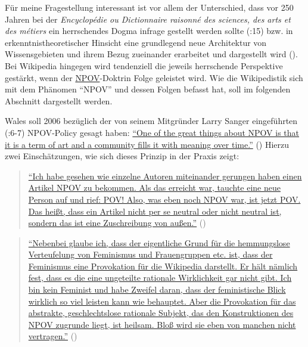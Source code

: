 \documentclass[fontsize=12pt]{scrartcl}
\begin{document}
F\"ur meine Fragestellung interessant ist vor allem der Unterschied, dass vor 250 Jahren bei der \textit{Encyclop\'{e}die ou Dictionnaire raisonn\'{e} des sciences, des arts et des m\'{e}tiers} ein herrschendes Dogma infrage gestellt werden sollte (\cite{Lih2009}:15) bzw. in er\-kennt\-nis\-the\-o\-\-re\-ti\-scher Hinsicht eine grundlegend neue Architektur von Wissensgebieten und ihrem Bezug zueinander erarbeitet und dargestellt wird (\cite{Darnton1972}). Bei Wi\-ki\-pe\-dia hingegen wird tendenziell die jeweils herrschende Perspektive ge\-st\"arkt, wenn der \href{https://de.wikipedia.org/wiki/Wikipedia:Neutraler_Standpunkt}{NPOV}-Doktrin Folge geleistet wird. Wie die Wikipedistik sich mit dem Ph\"anomen "`NPOV"' und dessen Folgen befasst hat, soll im folgenden Abschnitt dargestellt werden.

Wales soll 2006 bez\"uglich der von seinem Mitgr\"under Larry Sanger eingef\"uhrten (\cite{Lih2009}:6-7) NPOV-Policy gesagt haben: \href{http://reason.com/archives/2006/08/15/the-neutrality-of-this-article}{"`One of the great things about NPOV is that it is a term of art and a community fills it with meaning over time."'} (\cite{Mangu-Ward2006}) Hier\-zu zwei Ein\-sch\"at\-zungen, wie sich dieses Prinzip in der Praxis zeigt:

\singlespacing
\begin{quote}
\href{https://de.wikipedia.org/w/index.php?title=Wikipedia_Diskussion:Wiki-Dialoge\%2FQualit\%C3\%A4t\%2FWissenschaftliches_Schreiben\&diff=131040372\&oldid=131030900}{"`Ich habe gesehen wie einzelne Autoren miteinander gerungen haben einen Artikel NPOV zu bekommen. Als das erreicht war, tauchte eine neue Person auf und rief: POV! Also, was eben noch NPOV war, ist jetzt POV. Das hei{\ss}t, dass ein Artikel nicht per se neutral oder nicht neutral ist, sondern das ist eine Zuschreibung von au{\ss}en."'} (\cite{UserGoldzahn2014})
\end{quote}
\onehalfspacing

\singlespacing
\begin{quote}
\href{https://de.wikipedia.org/w/index.php?title=Wikipedia_Diskussion:Kurier\&diff=prev\&oldid=137785144}{"`Nebenbei glaube ich, dass der eigentliche Grund f\"ur die hemmungslose Verteufelung von \flq Feminismus\frq \,\,und \flq Frauengruppen\frq \,\,etc. ist, dass der Feminismus eine Provokation f\"ur die Wi\-ki\-pe\-dia darstellt. Er h\"alt n\"amlich fest, dass es die eine ungeteilte rationale Wirklichkeit gar nicht gibt. Ich bin kein Feminist und habe Zweifel daran, dass der feministische Blick wirklich so viel leisten kann wie behauptet. Aber die Provokation f\"ur das abstrakte, geschlechtslose rationale Subjekt, das den Konstruktionen des NPOV zugrunde liegt, ist heilsam. Blo{\ss} wird sie eben von manchen nicht vertragen."'} (\cite{UserMautpreller2015a})
\end{quote}
\onehalfspacing
\end{document}
